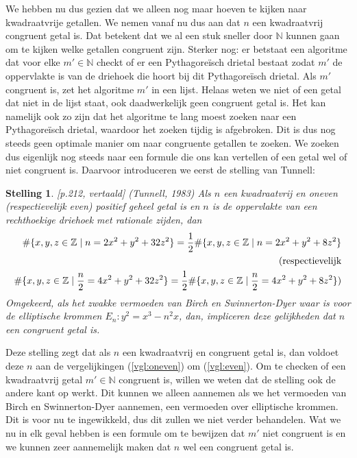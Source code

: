 \documentclass[12pt,reqno]{article}
\newcommand*{\NN}{\ensuremath{\mathbb{N}}}
\newcommand*{\ZZ}{\ensuremath{\mathbb{Z}}}
\theoremstyle{theorem}
\newtheorem{theorem}{Stelling}
\theoremstyle{definition}
\begin{document}
	We hebben nu dus gezien dat we alleen nog maar hoeven te kijken naar kwadraatvrije getallen. We nemen vanaf nu dus aan dat $n$ een kwadraatvrij congruent getal is. Dat betekent dat we al een stuk sneller door $\NN$ kunnen gaan om te kijken welke getallen congruent zijn. Sterker nog: er betstaat een algoritme dat voor elke $m'\in\NN$ checkt of er een Pythagore\"isch drietal bestaat zodat $m'$ de oppervlakte is van de driehoek die hoort bij dit Pythagore\"isch drietal. Als $m'$ congruent is, zet het algoritme $m'$ in een lijst. Helaas weten we niet of een getal dat niet in de lijst staat, ook daadwerkelijk geen congruent getal is. Het kan namelijk ook zo zijn dat het algoritme te lang moest zoeken naar een Pythagore\"isch drietal, waardoor het zoeken tijdig is afgebroken. Dit is dus nog steeds geen optimale manier om naar congruente getallen te zoeken. We zoeken dus eigenlijk nog steeds naar een formule die ons kan vertellen of een getal wel of niet congruent is. Daarvoor introduceren we eerst de stelling van Tunnell:
	\begin{theorem}\label{def:tunnell}
		\cite{Koblitz}[p.212, vertaald] (Tunnell, 1983) Als $n$ een kwadraatvrij en oneven (respectievelijk even) positief geheel getal is en $n$ is de oppervlakte van een rechthoekige driehoek met rationale zijden, dan
		\begin{align}
		\label{vgl:oneven} \#\{x,y,z\in\ZZ \mid n=2x^2+y^2+32z^2\} = \frac{1}{2} \#\{x,y,z\in\ZZ \mid n=2x^2+y^2+8z^2\}\\
		\notag \text{(respectievelijk} \\
		\label{vgl:even} \#\{x,y,z\in\ZZ \mid \frac{n}{2}=4x^2+y^2+32z^2\} = \frac{1}{2} \#\{x,y,z\in\ZZ \mid \frac{n}{2}=4x^2+y^2+8z^2\})
		\end{align}
		Omgekeerd, als het zwakke vermoeden van Birch en Swinnerton-Dyer waar is voor de elliptische krommen $E_n:y^2=x^3-n^2x$, dan, impliceren deze gelijkheden dat $n$ een congruent getal is.
	\end{theorem}
	\noindent Deze stelling zegt dat als $n$ een kwadraatvrij en congruent getal is, dan voldoet deze $n$ aan de vergelijkingen (\ref{vgl:oneven}) om (\ref{vgl:even}). Om te checken of een kwadraatvrij getal $m'\in\NN$ congruent is, willen we weten dat de stelling ook de andere kant op werkt. Dit kunnen we alleen aannemen als we het vermoeden van Birch en Swinnerton-Dyer aannemen, een vermoeden over elliptische krommen. Dit is voor nu te ingewikkeld, dus dit zullen we niet verder behandelen. Wat we nu in elk geval hebben is een formule om te bewijzen dat $m'$ niet congruent is en we kunnen zeer aannemelijk maken dat $n$ wel een congruent getal is.
	
\end{document}
